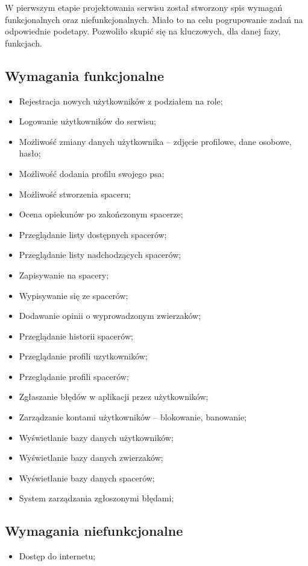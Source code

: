 W pierwszym etapie projektowania serwisu został stworzony spis wymagań funkcjonalnych oraz niefunkcjonalnych. Miało to na celu pogrupowanie zadań na odpowiednie podetapy. Pozwoliło skupić się na kluczowych, dla danej fazy, funkcjach.
\subsection{Wymagania funkcjonalne}
\begin{itemize}
    \item Rejestracja nowych użytkowników z podziałem na role;
    \item Logowanie użytkowników do serwisu;
    \item Możliwość zmiany danych użytkownika -- zdjęcie profilowe, dane osobowe, hasło;
    \item Możliwość dodania profilu swojego psa;
    \item Możliwość stworzenia spaceru;
    \item Ocena opiekunów po zakończonym spacerze;
    \item Przeglądanie listy dostępnych spacerów;
    \item Przeglądanie listy nadchodzących spacerów;
    \item Zapisywanie na spacery;
    \item Wypisywanie się ze spacerów;
    \item Dodawanie opinii o wyprowadzonym zwierzaków;
    \item Przeglądanie historii spacerów;
    \item Przeglądanie profili uzytkowników;
    \item Przeglądanie profili spacerów;
    \item Zgłaszanie błędów w aplikacji przez użytkowników;
    \item Zarządzanie kontami użytkowników -- blokowanie, banowanie;
    \item Wyświetlanie bazy danych użytkowników;
    \item Wyświetlanie bazy danych zwierzaków;
    \item Wyświetlanie bazy danych spacerów;
    \item System zarządzania zgłoszonymi błędami;
\end{itemize}
\subsection{Wymagania niefunkcjonalne}
\begin{itemize}
    \item Dostęp do internetu;
\end{itemize}
